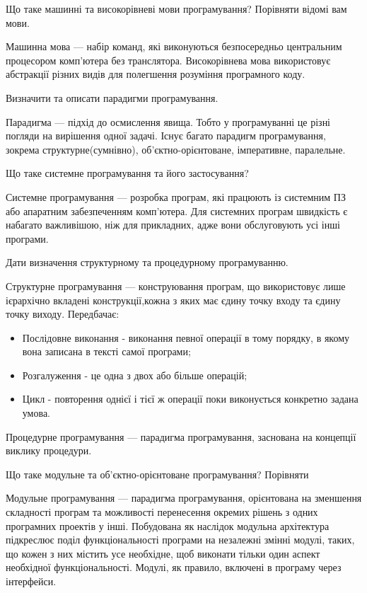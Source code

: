 \documentclass[a4paper, 12pt, oneside]{extarticle}
\begin{document}
\begin{itemize}
\question Що таке машинні та високорівневі мови програмування? Порівняти відомі вам мови.

\answer	 Машинна мова --- набір команд, які виконуються безпосередньо центральним процесором
		комп'ютера без транслятора. Високорівнева мова використовує абстракції
		різних видів для полегшення розуміння програмного коду.

\question Визначити та описати парадигми програмування.

\answer	 Парадигма --- підхід до осмислення явища. Тобто у програмуванні це різні погляди
		на вирішення одної задачі. Існує багато парадигм програмування, зокрема структурне(сумнівно),
об'єктно-орієнтоване, імперативне, паралельне.

\question Що таке системне програмування та його застосування?

	\answer	 Системне програмування --- розробка програм, які працюють із системним ПЗ або
	апаратним забезпеченням комп'ютера. Для системних програм швидкість є набагато
	важливішою, ніж для прикладних, адже вони обслуговують усі інші програми.

\question Дати визначення структурному та процедурному програмуванню.

\answer Структурне програмування --- конструювання програм, що використовує лише ієрархічно вкладені конструкції,кожна з яких має єдину точку входу та єдину точку виходу. Передбачає:

		\begin{itemize}
\item	Послідовне виконання - виконання певної операції в тому порядку, в якому вона записана в тексті самої програми;
\item	Розгалуження - це одна з двох або більше операцій;
\item	Цикл - повторення однієї і тієї ж операції поки виконується конкретно задана умова.
		\end{itemize}

Процедурне програмування --- парадигма програмування, заснована на концепції виклику процедури.

\question Що таке модульне та об’єктно-орієнтоване програмування? Порівняти

\answer Модульне програмування --- парадигма програмування, орієнтована на зменшення складності програм та можливості перенесення окремих рішень з одних програмних проектів у інші. Побудована як наслідок модульна архітектура підкреслює поділ функціональності програми на незалежні змінні модулі, таких, що кожен з них містить усе необхідне, щоб виконати тільки один аспект необхідної функціональності. Модулі, як правило, включені в програму через інтерфейси.


\end{itemize}
\end{document}
